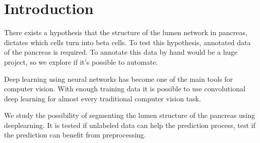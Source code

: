 \section{Introduction}\label{section:introduction}
There exists a hypothesis that the structure of the lumen network in pancreas, dictates which cells turn into beta cells.
To test this hypothesis, annotated data of the pancreas is required.
To annotate this data by hand would be a huge project, so we explore if it's possible to automate.

Deep learning using neural networks has become one of the main tools for computer vision.
With enough training data it is possible to use convolutional deep learning for almost every traditional computer vision task.

We study the possibility of segmenting the lumen structure of the pancreas using deeplearning.
It is tested if unlabeled data can help the prediction process, test if the prediction can benefit from preprocessing.
